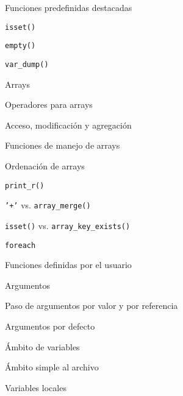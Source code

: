 \begin{longenum}
\begin{longenum}
\begin{longenum}
\begin{longenum}
            \end{longenum}
        \end{longenum}
        \item Funciones predefinidas destacadas
        \begin{longenum}
            \item \texttt{isset()}
            \item \texttt{empty()}
            \item \texttt{var\_dump()}
        \end{longenum}
        \item Arrays
        \begin{longenum}
            \item Operadores para arrays
            \begin{longenum}
                \item Acceso, modificación y agregación
            \end{longenum}
            \item Funciones de manejo de arrays
            \begin{longenum}
                \item Ordenación de arrays
                \item \texttt{print\_r()}
                \item \texttt{'+'} vs. \texttt{array\_merge()}
                \item \texttt{isset()} vs. \texttt{array\_key\_exists()}
            \end{longenum}
            \item \texttt{foreach}
        \end{longenum}
        \item Funciones definidas por el usuario
        \begin{longenum}
            \item Argumentos
            \begin{longenum}
                \item Paso de argumentos por valor y por referencia
                \item Argumentos por defecto
            \end{longenum}
            \item Ámbito de variables
            \begin{longenum}
                \item Ámbito simple al archivo
                \item Variables locales

\end{longenum}
\end{longenum}
\end{longenum}
\end{longenum}
